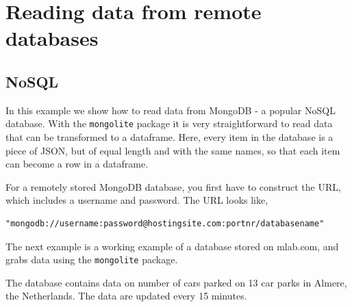 \documentclass[]{book}
\newenvironment{Shaded}{\begin{snugshade}}{\end{snugshade}}
\newcommand{\CommentTok}[1]{\textcolor[rgb]{0.56,0.35,0.01}{\textit{#1}}}
\newcommand{\DataTypeTok}[1]{\textcolor[rgb]{0.13,0.29,0.53}{#1}}
\newcommand{\DecValTok}[1]{\textcolor[rgb]{0.00,0.00,0.81}{#1}}
\newcommand{\KeywordTok}[1]{\textcolor[rgb]{0.13,0.29,0.53}{\textbf{#1}}}
\newcommand{\NormalTok}[1]{#1}
\newcommand{\OperatorTok}[1]{\textcolor[rgb]{0.81,0.36,0.00}{\textbf{#1}}}
\newcommand{\StringTok}[1]{\textcolor[rgb]{0.31,0.60,0.02}{#1}}
\begin{document}
\hypertarget{reading-data-from-remote-databases}{%
\section{Reading data from remote databases}\label{reading-data-from-remote-databases}}

\hypertarget{nosql}{%
\subsection{NoSQL}\label{nosql}}

In this example we show how to read data from MongoDB - a popular NoSQL database. With the \texttt{mongolite} package it is very straightforward to read data that can be transformed to a dataframe. Here, every item in the database is a piece of JSON, but of equal length and with the same names, so that each item can become a row in a dataframe.

For a remotely stored MongoDB database, you first have to construct the URL, which includes a username and password. The URL looks like,

\begin{verbatim}
"mongodb://username:password@hostingsite.com:portnr/databasename"
\end{verbatim}

The next example is a working example of a database stored on mlab.com, and grabs data using the \texttt{mongolite} package.

The database contains data on number of cars parked on 13 car parks in Almere, the Netherlands. The data are updated every 15 minutes.

\begin{Shaded}
\end{Shaded}
\end{document}
